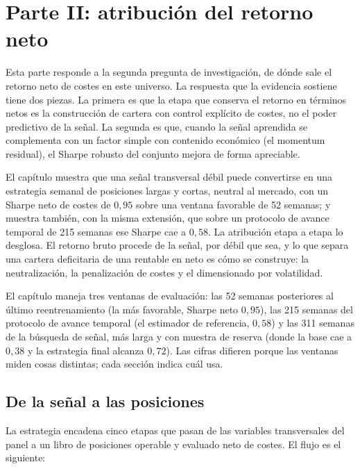 \chapter{Parte II: atribución del retorno neto}\label{cap:parte2}

Esta parte responde a la segunda pregunta de investigación, de dónde sale el retorno neto
de costes en este universo. La respuesta que la evidencia sostiene tiene dos piezas. La
primera es que la etapa que conserva el retorno en términos netos es la construcción de
cartera con control explícito de costes, no el poder predictivo de la señal. La segunda es
que, cuando la señal aprendida se complementa con un factor simple con contenido económico
(el momentum residual), el Sharpe robusto del conjunto mejora de forma apreciable.

El capítulo muestra que una señal transversal débil puede convertirse en una estrategia
semanal de posiciones largas y cortas, neutral al mercado, con un Sharpe neto de costes de
$0{,}95$ sobre una ventana favorable de 52 semanas; y muestra también, con la misma
extensión, que sobre un protocolo de avance temporal de 215 semanas ese Sharpe cae a
$0{,}58$. La atribución etapa a etapa lo desglosa. El retorno bruto procede de la señal, por débil
que sea, y lo que separa
una cartera deficitaria de una rentable en neto es cómo se construye: la neutralización,
la penalización de costes y el dimensionado por volatilidad.

El capítulo maneja tres ventanas de evaluación: las 52 semanas posteriores al último
reentrenamiento (la más favorable, Sharpe neto $0{,}95$), las 215 semanas del protocolo
de avance temporal (el estimador de referencia, $0{,}58$) y las 311 semanas de la
búsqueda de señal, más larga y con muestra de reserva (donde la base cae a $0{,}38$ y la
estrategia final alcanza $0{,}72$). Las cifras difieren porque las ventanas miden cosas
distintas; cada sección indica cuál usa.

\section{De la señal a las posiciones}\label{sec:p2-pipeline}

La estrategia encadena cinco etapas que pasan de las variables transversales del panel a
un libro de posiciones operable y evaluado neto de costes. El flujo es el siguiente:

